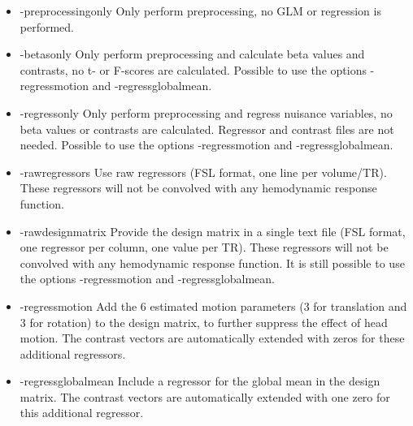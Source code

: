 \begin{itemize}

\item -preprocessingonly
\newline \newline Only perform preprocessing, no GLM or regression is performed.

\item -betasonly
\newline \newline Only perform preprocessing and calculate beta values and contrasts, no t- or F-scores are calculated. Possible to use the options -regressmotion and -regressglobalmean.

\item -regressonly
\newline \newline Only perform preprocessing and regress nuisance variables, no beta values or contrasts are calculated. Regressor and contrast files are not needed. Possible to use the options -regressmotion and -regressglobalmean.

\item -rawregressors
\newline \newline Use raw regressors (FSL format, one line per volume/TR). These regressors will not be convolved with any hemodynamic response function.

\item -rawdesignmatrix 
\newline \newline Provide the design matrix in a single text file (FSL format, one regressor per column, one value per TR). These regressors will not be convolved with any hemodynamic response function. It is still possible to use the options -regressmotion and -regressglobalmean.

\item -regressmotion 
\newline \newline Add the 6 estimated motion parameters (3 for translation and 3 for rotation) to the design matrix, to further suppress the effect of head motion. The contrast vectors are automatically extended with zeros for these additional regressors. 

\item -regressglobalmean 
\newline \newline Include a regressor for the global mean in the design matrix. The contrast vectors are automatically extended with one zero for this additional regressor. 
 

\end{itemize}
